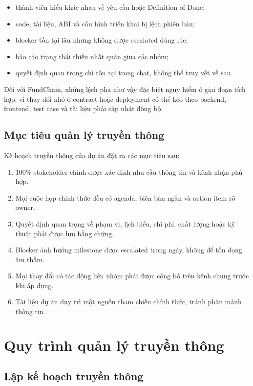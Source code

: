 \begin{itemize}
  \item thành viên hiểu khác nhau về yêu cầu hoặc Definition of Done;
  \item code, tài liệu, ABI và cấu hình triển khai bị lệch phiên bản;
  \item blocker tồn tại lâu nhưng không được escalated đúng lúc;
  \item báo cáo trạng thái thiếu nhất quán giữa các nhóm;
  \item quyết định quan trọng chỉ tồn tại trong chat, không thể truy vết về sau.
\end{itemize}

Đối với FundChain, những lệch pha như vậy đặc biệt nguy hiểm ở giai đoạn tích hợp, vì thay đổi nhỏ ở contract hoặc deployment có thể kéo theo backend, frontend, test case và tài liệu phải cập nhật đồng bộ.

\subsection{Mục tiêu quản lý truyền thông}

Kế hoạch truyền thông của dự án đặt ra các mục tiêu sau:

\begin{enumerate}
  \item 100\% stakeholder chính được xác định nhu cầu thông tin và kênh nhận phù hợp.
  \item Mọi cuộc họp chính thức đều có agenda, biên bản ngắn và action item rõ owner.
  \item Quyết định quan trọng về phạm vi, lịch biểu, chi phí, chất lượng hoặc kỹ thuật phải được lưu bằng chứng.
  \item Blocker ảnh hưởng milestone được escalated trong ngày, không để tồn đọng âm thầm.
  \item Mọi thay đổi có tác động liên nhóm phải được công bố trên kênh chung trước khi áp dụng.
  \item Tài liệu dự án duy trì một nguồn tham chiếu chính thức, tránh phân mảnh thông tin.
\end{enumerate}

\section{Quy trình quản lý truyền thông}

\subsection{Lập kế hoạch truyền thông}

